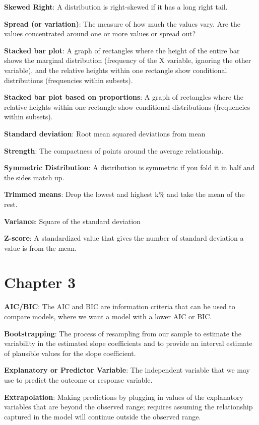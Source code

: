 \documentclass[]{book}
\begin{document}
\textbf{Skewed Right}: A distribution is right-skewed if it has a long right tail.

\textbf{Spread (or variation)}: The measure of how much the values vary. Are the values concentrated around one or more values or spread out?

\textbf{Stacked bar plot}: A graph of rectangles where the height of the entire bar shows the marginal distribution (frequency of the X variable, ignoring the other variable), and the relative heights within one rectangle show conditional distributions (frequencies within subsets).

\textbf{Stacked bar plot based on proportions}: A graph of rectangles where the relative heights within one rectangle show conditional distributions (frequencies within subsets).

\textbf{Standard deviation}: Root mean squared deviations from mean

\textbf{Strength}: The compactness of points around the average relationship.

\textbf{Symmetric Distribution}: A distribution is symmetric if you fold it in half and the sides match up.

\textbf{Trimmed means}: Drop the lowest and highest k\% and take the mean of the rest.

\textbf{Variance}: Square of the standard deviation

\textbf{Z-score}: A standardized value that gives the number of standard deviation a value is from the mean.

\hypertarget{chapter-3}{%
\section{Chapter 3}\label{chapter-3}}

\textbf{AIC/BIC}: The AIC and BIC are information criteria that can be used to compare models, where we want a model with a lower AIC or BIC.

\textbf{Bootstrapping}: The process of resampling from our sample to estimate the variability in the estimated slope coefficients and to provide an interval estimate of plausible values for the slope coefficient.

\textbf{Explanatory or Predictor Variable}: The independent variable that we may use to predict the outcome or response variable.

\textbf{Extrapolation}: Making predictions by plugging in values of the explanatory variables that are beyond the observed range; requires assuming the relationship captured in the model will continue outside the observed range.
\end{document}
